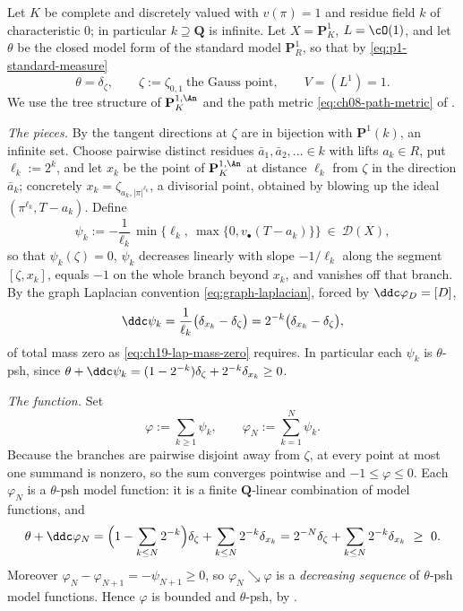 \begin{example}
\label{ex:ch24-branch-sum}
Let \(K\) be complete and discretely valued with \(v(\pi)=1\) and residue
field \(k\) of characteristic \(0\); in particular \(k\supseteq\mathbf Q\) is
infinite.  Let \(X=\mathbf P^1_K\), \(L=\cO(1)\), and let \(\theta\) be the
closed model form of the standard model \(\mathbf P^1_R\), so that by
\eqref{eq:p1-standard-measure}
\[
 \theta=\delta_{\zeta},\qquad \zeta:=\zeta_{0,1}
 \ \text{the Gauss point},\qquad V=(L^1)=1 .
\]
We use the tree structure of \(\mathbf P^{1,\An}_K\) and the path metric
\eqref{eq:ch08-path-metric} of .

\emph{The pieces.}  By  the tangent directions at
\(\zeta\) are in bijection with \(\mathbf P^1(k)\), an infinite set.  Choose
pairwise distinct residues \(\bar a_1,\bar a_2,\ldots\in k\) with lifts
\(a_k\in R\), put \(\ell_k:=2^k\), and let \(x_k\) be the point of
\(\mathbf P^{1,\An}_K\) at distance \(\ell_k\) from \(\zeta\) in the
direction \(\bar a_k\); concretely \(x_k=\zeta_{a_k,|\pi|^{\ell_k}}\), a
divisorial point, obtained by blowing up the ideal
\((\pi^{\ell_k},T-a_k)\).  Define
\[
 \psi_k:=-\frac1{\ell_k}\,
   \min\bigl\{\ell_k,\ \max\{0,v_\bullet(T-a_k)\}\bigr\}
   \ \in\ \mathcal D(X),
\]
so that \(\psi_k(\zeta)=0\), \(\psi_k\) decreases linearly with slope
\(-1/\ell_k\) along the segment \([\zeta,x_k]\), equals \(-1\) on the whole
branch beyond \(x_k\), and vanishes off that branch.  By the graph
Laplacian convention \eqref{eq:graph-laplacian}, forced by
\(\ddc\varphi_D=[D]\),
\[
 \ddc\psi_k=\frac1{\ell_k}\bigl(\delta_{x_k}-\delta_{\zeta}\bigr)
 =2^{-k}\bigl(\delta_{x_k}-\delta_{\zeta}\bigr),
\]
of total mass zero as \eqref{eq:ch19-lap-mass-zero} requires.  In
particular each \(\psi_k\) is \(\theta\)-psh, since
\(\theta+\ddc\psi_k=(1-2^{-k})\delta_\zeta+2^{-k}\delta_{x_k}\geq0\).

\emph{The function.}  Set
\[
 \varphi:=\sum_{k\geq1}\psi_k,
 \qquad
 \varphi_N:=\sum_{k=1}^{N}\psi_k .
\]
Because the branches are pairwise disjoint away from \(\zeta\), at every
point at most one summand is nonzero, so the sum converges pointwise and
\(-1\leq\varphi\leq0\).  Each \(\varphi_N\) is a \(\theta\)-psh model
function: it is a finite \(\mathbf Q\)-linear combination of model functions,
and
\[
 \theta+\ddc\varphi_N
 =\Bigl(1-\sum_{k\leq N}2^{-k}\Bigr)\delta_\zeta
  +\sum_{k\leq N}2^{-k}\delta_{x_k}
 =2^{-N}\delta_\zeta+\sum_{k\leq N}2^{-k}\delta_{x_k}\ \geq\ 0 .
\]
Moreover \(\varphi_N-\varphi_{N+1}=-\psi_{N+1}\geq0\), so
\(\varphi_N\searrow\varphi\) is a \emph{decreasing sequence} of
\(\theta\)-psh model functions.  Hence \(\varphi\) is bounded and
\(\theta\)-psh, by .


\end{example}
